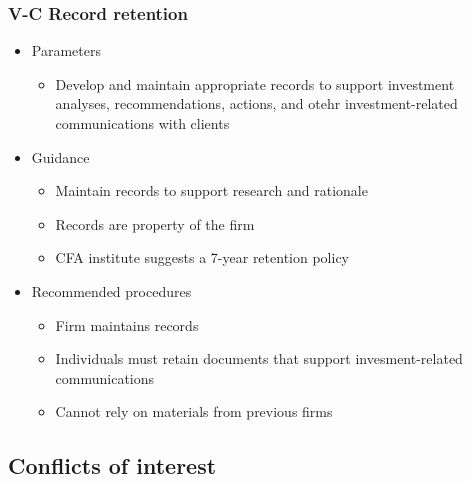 \documentclass[../notes_compiled.tex]{subfiles}
\begin{document}
\subsubsection{V-C Record retention}
\begin{itemize}
\item Parameters
\begin{itemize}
\item Develop and maintain appropriate records to support investment analyses, recommendations, actions, and otehr investment-related communications with clients
\end{itemize}
\item Guidance
\begin{itemize}
\item Maintain records to support research and rationale
\item Records are property of the firm
\item CFA institute suggests a 7-year retention policy
\end{itemize}
\item Recommended procedures
\begin{itemize}
\item Firm maintains records
\item Individuals must retain documents that support invesment-related communications
\item Cannot rely on materials from previous firms
\end{itemize}
\end{itemize}
\subsection{Conflicts of interest}
\end{document}
